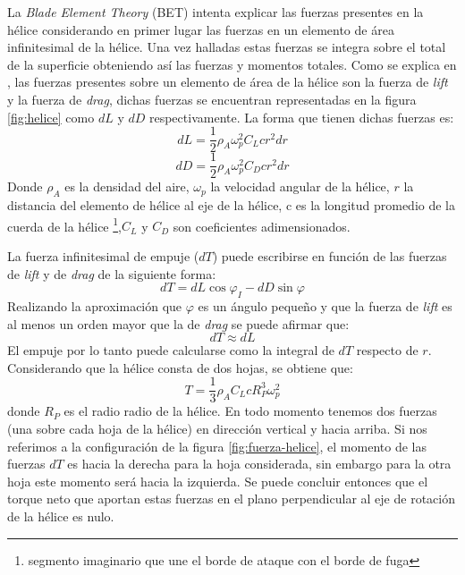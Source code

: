 \documentclass[main]{subfiles}
\begin{document}
La \emph{Blade Element Theory} (BET) intenta explicar las fuerzas presentes en la h\'elice considerando en primer lugar las fuerzas en un elemento de \'area infinitesimal de la h\'elice. Una vez halladas estas fuerzas se integra sobre el total de la superficie obteniendo as\'i las fuerzas y momentos totales. Como se explica en \cite{bib:fuerzas-helices}, las fuerzas presentes sobre un elemento de \'area de la h\'elice son la fuerza de \emph{lift} y la fuerza de \emph{drag}, dichas fuerzas se encuentran representadas en la figura \ref{fig:helice} como $dL$ y $dD$ respectivamente. La forma que tienen dichas fuerzas es:
\begin{equation}
dL=\frac{1}{2}\rho_A \omega_p^2 C_L c r^2dr
\end{equation}
\begin{equation}
dD=\frac{1}{2}\rho_A \omega_p^2 C_D c r^2dr
\end{equation}
Donde $\rho_A$ es la densidad del aire, $\omega_p$ la velocidad angular de la h\'elice, $r$ la distancia del elemento de h\'elice al eje de la h\'elice, c es la longitud promedio de la cuerda de la h\'elice \footnote{segmento imaginario que une el borde de ataque con el borde de fuga},$ C_L$ y $C_D$ son coeficientes adimensionados.

La fuerza infinitesimal de empuje ($dT$) puede escribirse en funci\'on de las fuerzas de \emph{lift} y de \emph{drag} de la siguiente forma:
\begin{equation}
dT=dL\cos\varphi_I-dD\sin\varphi
\end{equation}
Realizando la aproximaci\'on que $\varphi$ es un \'angulo peque\~no y que la fuerza de \emph{lift} es al menos un orden mayor que la de \emph{drag} se puede afirmar que:
\begin{equation}
dT\approx dL
\end{equation}
El empuje por lo tanto puede calcularse como la integral de $dT$ respecto de $r$. Considerando que la h\'elice consta de dos hojas, se obtiene que:
\begin{equation}
\label{eq:fuerza}
T=\frac{1}{3}\rho_A C_L c R_P^3\omega_p^2
\end{equation}
donde $R_P$ es el radio radio de la h\'elice. En todo momento tenemos dos fuerzas (una sobre cada hoja de la h\'elice) en direcci\'on vertical y hacia arriba. Si nos referimos a la configuraci\'on de la figura \ref{fig:fuerza-helice}, el momento de las fuerzas $dT$ es hacia la derecha para la hoja considerada, sin embargo para la otra hoja este momento ser\'a hacia la izquierda. Se puede concluir entonces que el torque neto que aportan estas fuerzas en el plano perpendicular al eje de rotaci\'on de la h\'elice es nulo.\\
\end{document}
